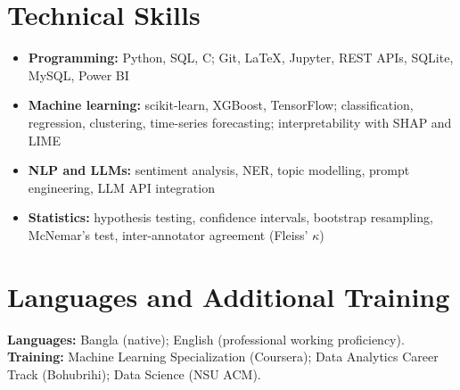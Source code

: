 \documentclass[10pt,a4paper]{article}
\begin{document}
\section{Technical Skills}
\begin{itemize}
\item \textbf{Programming:} Python, SQL, C; Git, \LaTeX, Jupyter, REST APIs,
      SQLite, MySQL, Power BI
\item \textbf{Machine learning:} scikit-learn, XGBoost, TensorFlow;
      classification, regression, clustering, time-series forecasting;
      interpretability with SHAP and LIME
\item \textbf{NLP and LLMs:} sentiment analysis, NER, topic modelling, prompt
      engineering, LLM API integration
\item \textbf{Statistics:} hypothesis testing, confidence intervals, bootstrap
      resampling, McNemar's test, inter-annotator agreement (Fleiss' $\kappa$)
\end{itemize}

\section{Languages and Additional Training}
\textbf{Languages:} Bangla (native); English (professional working
proficiency).\\
\textbf{Training:} Machine Learning Specialization (Coursera); Data Analytics
Career Track (Bohubrihi); Data Science (NSU ACM).
\end{document}
